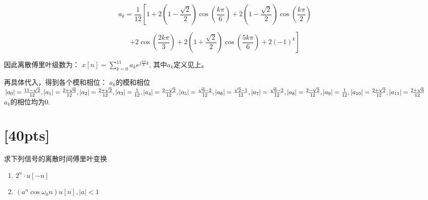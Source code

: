 \documentclass[a4paper,UTF8]{article}
\numberwithin{equation}{section}
\begin{document}
\begin{framed}
\begin{enumerate}[(1)]
    	\[ a_k = \frac{1}{12} \left[ 1 + 2\left(1 - \frac{\sqrt{2}}{2}\right) \cos\left(\frac{k\pi}{6}\right) + 2\left(1 - \frac{\sqrt{2}}{2}\right) \cos\left(\frac{k\pi}{2}\right) \right. \]
    	
    	\[ \left. + 2 \cos\left(\frac{2k\pi}{3}\right) + 2\left(1 + \frac{\sqrt{2}}{2}\right) \cos\left(\frac{5k\pi}{6}\right) + 2(-1)^k \right] \]
    	
    	因此离散傅里叶级数为：
    	$x[n] = \sum_{k=0}^{11}a_ke^{j\frac{n\pi}{6}k}$, 其中$a_k$定义见上。
    	
    	
    	再具体代入，得到各个模和相位：
    	$a_k\text{的模和相位}$\\
    	$|a_0|=\frac{11-\sqrt{2}}{12},|a_1|=\frac{2+\sqrt{6}}{12}, |a_2|=\frac{2+\sqrt{2}}{12},|a_3|=\frac{1}{12},|a_4|=\frac{2-\sqrt{2}}{12},|a_5|=\frac{\sqrt{6}-2}{12},\\
    	|a_6|=\frac{\sqrt{2}-1}{12},|a_7|=\frac{\sqrt{6}-2}{12},|a_8|=\frac{2-\sqrt{2}}{12},|a_9|=\frac{1}{12},|a_{10}|=\frac{2+\sqrt{2}}{12},|a_{11}|=\frac{2+\sqrt{6}}{12}$\\
    	$a_k\text{的相位均为}0$.
    \end{enumerate}
\end{framed}




\newpage
\section{[40pts]}
求下列信号的离散时间傅里叶变换
\begin{enumerate}[(1)]
    \item $2^{n}\cdot u[-n]$
    \item $(a^{n}\cos{\omega_{0}n})u[n],\left | a \right | < 1$
\end{enumerate}
\end{document}
